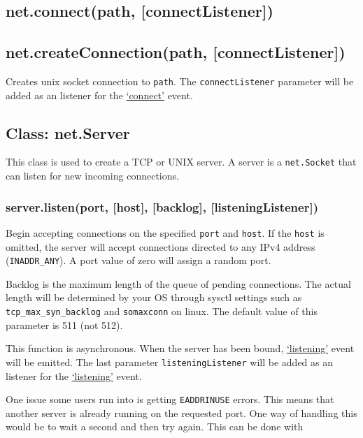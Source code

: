 \subsection{net.connect(path, {[}connectListener{]})}

\subsection{net.createConnection(path, {[}connectListener{]})}

Creates unix socket connection to \texttt{path}. The
\texttt{connectListener} parameter will be added as an listener for the
\hyperref[net_event_connect]{`connect'} event.

\subsection{Class: net.Server}

This class is used to create a TCP or UNIX server. A server is a
\texttt{net.Socket} that can listen for new incoming connections.

\subsubsection{server.listen(port, {[}host{]}, {[}backlog{]},
{[}listeningListener{]})}

Begin accepting connections on the specified \texttt{port} and
\texttt{host}. If the \texttt{host} is omitted, the server will accept
connections directed to any IPv4 address (\texttt{INADDR\_ANY}). A port
value of zero will assign a random port.

Backlog is the maximum length of the queue of pending connections. The
actual length will be determined by your OS through sysctl settings such
as \texttt{tcp\_max\_syn\_backlog} and \texttt{somaxconn} on linux. The
default value of this parameter is 511 (not 512).

This function is asynchronous. When the server has been bound,
\hyperref[net_event_listening]{`listening'} event will be emitted. The
last parameter \texttt{listeningListener} will be added as an listener
for the \hyperref[net_event_listening]{`listening'} event.

One issue some users run into is getting \texttt{EADDRINUSE} errors.
This means that another server is already running on the requested port.
One way of handling this would be to wait a second and then try again.
This can be done with

